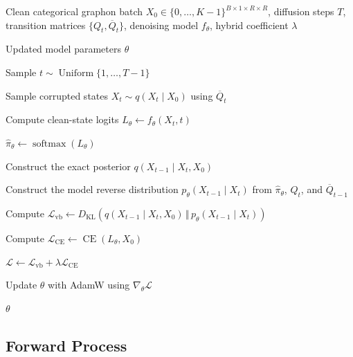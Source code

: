 \begin{algorithm}[H]
    \caption{D3PM training step over categorical graphon representations}
    \label{alg:d3pm_training_step}
    \begin{algorithmic}[1]
    
    \Require Clean categorical graphon batch
             $X_0 \in \{0,\ldots,K-1\}^{B\times1\times R\times R}$,
             diffusion steps $T$,
             transition matrices $\{Q_t,\overline{Q}_t\}$,
             denoising model $f_\theta$,
             hybrid coefficient $\lambda$
    
    \Ensure Updated model parameters $\theta$
    
    \State Sample
           $t \sim \operatorname{Uniform}\{1,\ldots,T-1\}$
    
    \State Sample corrupted states
           $X_t \sim q(X_t \mid X_0)$
           using $\overline{Q}_t$
    
    \State Compute clean-state logits
           $L_\theta \gets f_\theta(X_t,t)$
    
    \State $\widehat{\pi}_\theta
           \gets \operatorname{softmax}(L_\theta)$
    
    \State Construct the exact posterior
           $q(X_{t-1}\mid X_t,X_0)$
    
    \State Construct the model reverse distribution
           $p_\theta(X_{t-1}\mid X_t)$
           from $\widehat{\pi}_\theta$, $Q_t$, and $\overline{Q}_{t-1}$
    
    \State Compute
           $\mathcal{L}_{\mathrm{vb}}
           \gets
           D_{\mathrm{KL}}
           \!\left(
           q(X_{t-1}\mid X_t,X_0)
           \,\Vert\,
           p_\theta(X_{t-1}\mid X_t)
           \right)$
    
    \State Compute
           $\mathcal{L}_{\mathrm{CE}}
           \gets
           \operatorname{CE}(L_\theta,X_0)$
    
    \State $\mathcal{L}
           \gets
           \mathcal{L}_{\mathrm{vb}}
           +
           \lambda\mathcal{L}_{\mathrm{CE}}$
    
    \State Update $\theta$ with AdamW using $\nabla_\theta\mathcal{L}$
    
    \State \Return $\theta$
    
    \end{algorithmic}
\end{algorithm}

\subsection{Forward Process}
\label{subsec:method_d3pm_forward}

